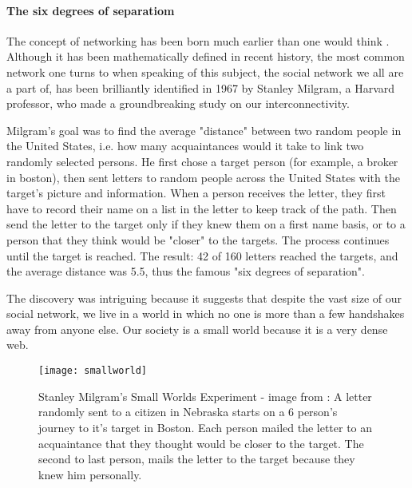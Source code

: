 \paragraph{The six degrees of separatiom}
The concept of networking has been born much earlier than one would think \cite{linked}. Although it has been mathematically defined in recent history, the most common network one turns to when speaking of this subject, the social network we all are a part of, has been brilliantly identified in 1967 by Stanley Milgram, a Harvard professor, who made a groundbreaking study on our interconnectivity.\par 
Milgram's goal was to find the average "distance" between two random people in the United States, i.e. how many acquaintances would it take to link two randomly selected persons. He first chose a target person (for example, a broker in boston), then sent letters to random people across the United States with the target's picture and information. When a person receives the letter, they first have to record their name on a list in the letter to keep track of the path. Then send the letter to the target only if they knew them on a first name basis, or to a person that they think would be "closer" to the targets. The process continues until the target is reached. The result: 42 of 160 letters reached the targets, and the average distance was 5.5, thus the famous "six degrees of separation".\par 
The discovery was intriguing because it suggests that despite the vast size of our social network, we live in a world in which no one is more than a few handshakes away from anyone else. Our society is a small world because it is a very dense web.

\begin{figure}[!h]
  \centering
  \texttt{[image: smallworld]}
  \caption{Stanley Milgram's Small Worlds Experiment - image from \cite{smallworlds}: A letter randomly sent to a citizen in Nebraska starts on a 6 person's journey to it's target in Boston. Each person mailed the letter to an acquaintance that they thought would be closer to the target. The second to last person, mails the letter to the target because they knew him personally.}
  \label{fig:smallWorld}
\end{figure}



